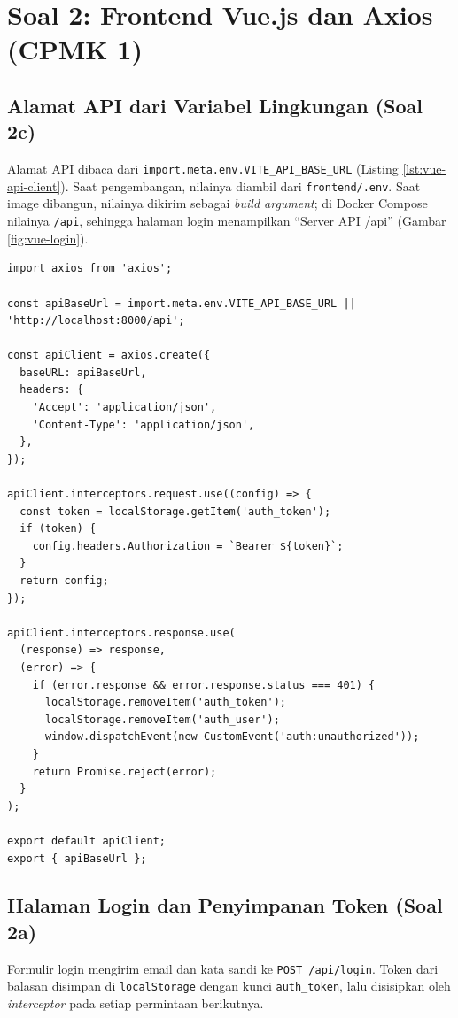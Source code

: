 \documentclass[a4paper,oneside,12pt]{report}
\begin{document}
\section{Soal 2: Frontend Vue.js dan Axios (CPMK 1)}

\subsection{Alamat API dari Variabel Lingkungan (Soal 2c)}
Alamat API dibaca dari \texttt{import.meta.env.VITE\_API\_BASE\_URL} (Listing \ref{lst:vue-api-client}). Saat pengembangan, nilainya diambil dari \texttt{frontend/.env}. Saat image dibangun, nilainya dikirim sebagai \textit{build argument}; di Docker Compose nilainya \texttt{/api}, sehingga halaman login menampilkan ``Server API /api'' (Gambar \ref{fig:vue-login}).

\begin{lstlisting}[style=jsstyle,caption={Klien Axios di frontend/src/api.js.},label={lst:vue-api-client}]
import axios from 'axios';

const apiBaseUrl = import.meta.env.VITE_API_BASE_URL || 'http://localhost:8000/api';

const apiClient = axios.create({
  baseURL: apiBaseUrl,
  headers: {
    'Accept': 'application/json',
    'Content-Type': 'application/json',
  },
});

apiClient.interceptors.request.use((config) => {
  const token = localStorage.getItem('auth_token');
  if (token) {
    config.headers.Authorization = `Bearer ${token}`;
  }
  return config;
});

apiClient.interceptors.response.use(
  (response) => response,
  (error) => {
    if (error.response && error.response.status === 401) {
      localStorage.removeItem('auth_token');
      localStorage.removeItem('auth_user');
      window.dispatchEvent(new CustomEvent('auth:unauthorized'));
    }
    return Promise.reject(error);
  }
);

export default apiClient;
export { apiBaseUrl };
\end{lstlisting}

\subsection{Halaman Login dan Penyimpanan Token (Soal 2a)}
Formulir login mengirim email dan kata sandi ke \texttt{POST /api/login}. Token dari balasan disimpan di \texttt{localStorage} dengan kunci \texttt{auth\_token}, lalu disisipkan oleh \textit{interceptor} pada setiap permintaan berikutnya.
\end{document}
